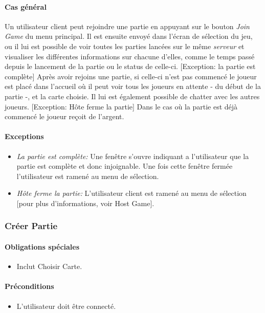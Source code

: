 \documentclass[a4paper,11pt]{report}
\begin{document}
\paragraph{Cas général}
Un utilisateur client peut rejoindre une partie en appuyant sur le bouton \og \textit{Join Game} \fg 
du menu principal.
Il est ensuite envoyé dans l'écran de sélection du jeu, ou il lui est possible de voir toutes les parties lancées sur le
même \textit{serveur} et visualiser les différentes informations sur chacune d'elles, comme le temps passé depuis le lancement
de la partie ou le status de celle-ci.
[Exception: la partie est complète]
Après avoir rejoins une partie, si celle-ci n'est pas commencé le joueur est placé dans l’accueil où il peut
voir tous les joueurs en attente - du début de la partie -, et la carte choisie. Il lui
est également possible de chatter avec les autres joueurs. 
[Exception: Hôte ferme la partie]
Dans le cas où la partie est déjà commencé le joueur reçoit de l'argent.
\paragraph{Exceptions}
\begin{itemize}
 \item \textit{La partie est complète:} Une fenêtre s'ouvre indiquant a l'utilisateur que la partie est complète
 et donc injoignable. Une fois cette fenêtre fermée l'utilisateur est ramené au menu de sélection.
 \item \textit{Hôte ferme la partie:} L'utilisateur client est ramené au menu de sélection [pour plus d'informations, voir
 Host Game]. 
\end{itemize}

\subsubsection{Créer Partie}
\paragraph{Obligations spéciales}
\begin{itemize}
 \item Inclut Choisir Carte.
\end{itemize}
\paragraph{Préconditions}
\begin{itemize}
 \item L'utilisateur doit être connecté.
\end{itemize}
\end{document}
